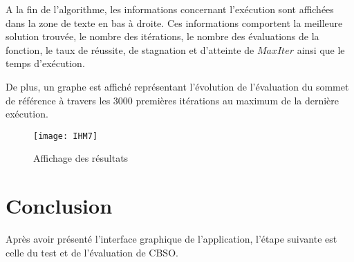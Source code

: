 A la fin de l'algorithme, les informations concernant l'exécution sont affichées dans la zone de texte en bas à droite. Ces informations comportent la meilleure solution trouvée, le nombre des itérations, le nombre des évaluations de la fonction, le taux de réussite, de stagnation et d'atteinte de $MaxIter$ ainsi que le temps d'exécution.

\vspace{0.5em}

De plus, un graphe est affiché représentant l'évolution de l'évaluation du sommet de référence à travers les 3000 premières itérations au maximum de la dernière exécution.

\begin{figure}[H]
	\centering
	\texttt{[image: IHM7]}
	\caption{Affichage des résultats}
\end{figure}

\section*{Conclusion}
Après avoir présenté l'interface graphique de l'application, l'étape suivante est celle du test et de l'évaluation de CBSO.
